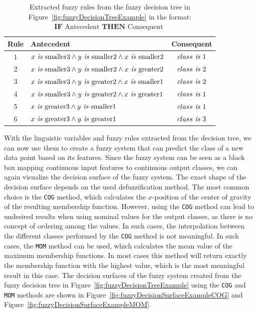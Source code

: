 \begin{table}[H]
    \centering
    \begin{tabular}{c|l|c}
        \textbf{Rule} & \textbf{Antecedent}                                                             & \textbf{Consequent} \\
        \hline
        1             & $x \textit{ is } \text{smaller3} \land y \textit{ is } \text{smaller2} \land x \textit{ is } \text{smaller2}$ & $class \textit{ is } 1$       \\
        2             & $x \textit{ is } \text{smaller3} \land y \textit{ is } \text{smaller2} \land x \textit{ is } \text{greater2}$ & $class \textit{ is } 2$       \\
        3             & $x \textit{ is } \text{smaller3} \land y \textit{ is } \text{greater2} \land x \textit{ is } \text{smaller1}$ & $class \textit{ is } 2$       \\
        4             & $x \textit{ is } \text{smaller3} \land y \textit{ is } \text{greater2} \land x \textit{ is } \text{greater1}$ & $class \textit{ is } 1$       \\
        5             & $x \textit{ is } \text{greater3} \land y \textit{ is } \text{smaller1}$                             & $class \textit{ is } 1$       \\
        6             & $x \textit{ is } \text{greater3} \land y \textit{ is } \text{greater1}$                             & $class \textit{ is } 3$       \\
    \end{tabular}
    \caption[Extracted fuzzy rules from the fuzzy decision tree]{Extracted fuzzy rules from the fuzzy decision tree in Figure~\ref{fig:fuzzyDecisionTreeExample} in the format: $\textbf{IF} \text{ Antecedent } \textbf{THEN} \text{ Consequent }$}
    \label{tab:fuzzyRulesExample}
\end{table}


With the linguistic variables and fuzzy rules extracted from the decision tree, we can now use them to create a fuzzy system that can predict the class of a new data point based on its features. Since the fuzzy system can be seen as a black box mapping continuous input features to continuous output classes, we can again visualize the decision surface of the fuzzy system. The exact shape of the decision surface depends on the used defuzzification method. The most common choice is the \texttt{COG} method, which calculates the $x$-position of the center of gravity of the resulting membership function.
However, using the \texttt{COG} method can lead to undesired results when using nominal  values for the output classes, as there is no concept of ordering among the values. In such cases, the interpolation between the different classes performed by the \texttt{COG} method is not meaningful. In such cases, the \texttt{MOM} method can be used, which calculates the mean value of the maximum membership functions. In most cases this method will return exactly the membership function with the highest value, which is the most meaningful result in this case. The decision surfaces of the fuzzy system created from the fuzzy decision tree in Figure~\ref{fig:fuzzyDecisionTreeExample} using the \texttt{COG} and \texttt{MOM} methods are shown in Figure~\ref{fig:fuzzyDecisionSurfaceExampleCOG} and Figure~\ref{fig:fuzzyDecisionSurfaceExampleMOM}.


